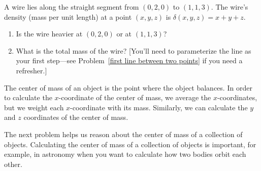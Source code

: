 \begin{problem}
%
 A wire lies along the straight segment from $(0,2,0)$ to $(1,1,3)$.  The wire's density (mass per unit length) at a point $(x,y,z)$ is $\delta(x,y,z)=x+y+z$. 
 \begin{enumerate}
 \item Is the wire heavier at $(0,2,0)$ or at $(1,1,3)$?
 \item  What is the total mass of the wire?  [You'll need to parameterize the line as your first step---see Problem~\ref{first line between two points} if you need a refresher.]
 \end{enumerate}
\end{problem}


%
The center of mass of an object is the point where the object balances.  In order to calculate the $x$-coordinate of the center of mass, we average the $x$-coordinates, but we weight each $x$-coordinate with its mass.  Similarly, we can calculate the $y$ and $z$ coordinates of the center of mass.

The next problem helps us reason about the center of mass of a collection of objects.  Calculating the center of mass of a collection of objects is important, for example, in astronomy when you want to calculate how two bodies orbit each other.

